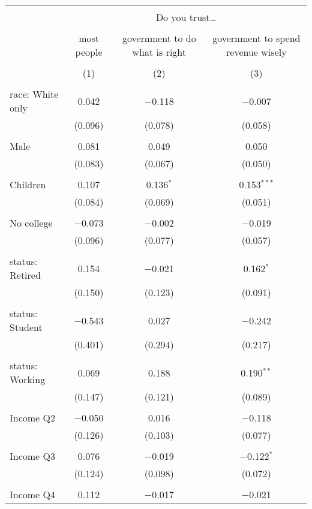 
\begin{tabular}{@{\extracolsep{5pt}}lccc} 
\\[-1.8ex]\hline 
\hline \\[-1.8ex] 
 & \multicolumn{3}{c}{Do you trust…} \\ 
\cline{2-4} 
\\[-1.8ex] & most people & government to do what is right & government to spend revenue wisely \\ 
\\[-1.8ex] & (1) & (2) & (3)\\ 
\hline \\[-1.8ex] 
 race: White only & 0.042 & $-$0.118 & $-$0.007 \\ 
  & (0.096) & (0.078) & (0.058) \\ 
  & & & \\ 
 Male & 0.081 & 0.049 & 0.050 \\ 
  & (0.083) & (0.067) & (0.050) \\ 
  & & & \\ 
 Children & 0.107 & 0.136$^{*}$ & 0.153$^{***}$ \\ 
  & (0.084) & (0.069) & (0.051) \\ 
  & & & \\ 
 No college & $-$0.073 & $-$0.002 & $-$0.019 \\ 
  & (0.096) & (0.077) & (0.057) \\ 
  & & & \\ 
 status: Retired & 0.154 & $-$0.021 & 0.162$^{*}$ \\ 
  & (0.150) & (0.123) & (0.091) \\ 
  & & & \\ 
 status: Student & $-$0.543 & 0.027 & $-$0.242 \\ 
  & (0.401) & (0.294) & (0.217) \\ 
  & & & \\ 
 status: Working & 0.069 & 0.188 & 0.190$^{**}$ \\ 
  & (0.147) & (0.121) & (0.089) \\ 
  & & & \\ 
 Income Q2 & $-$0.050 & 0.016 & $-$0.118 \\ 
  & (0.126) & (0.103) & (0.077) \\ 
  & & & \\ 
 Income Q3 & 0.076 & $-$0.019 & $-$0.122$^{*}$ \\ 
  & (0.124) & (0.098) & (0.072) \\ 
  & & & \\ 
 Income Q4 & 0.112 & $-$0.017 & $-$0.021 \\ 

\end{tabular}
